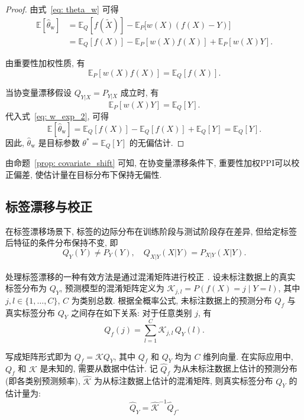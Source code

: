 \documentclass[a4paper, AutoFakeBold, UTF8]{ctexrep}
\theoremstyle{plain}
\newcommand{\upcite}[1]
{\textsuperscript{~\cite{#1}}}
\numberwithin{equation}{chapter}
\begin{document}
\begin{proof}
由式~\eqref{eq: theta_w} 可得
\begin{align}
\mathbb{E}[\hat{\theta}_{\text{w}}]
&=
\mathbb{E}_Q[f (\tilde X) ]
-
\mathbb{E}_P\bigl[w (X)  (f (X) -Y) \bigr] \label{eq: w_exp_1}\\
&=
\mathbb{E}_Q[f (X) ]
-
\mathbb{E}_P[w (X) f (X) ]
+
\mathbb{E}_P[w (X) Y].
\label{eq: w_exp_2}
\end{align}

由重要性加权性质, 有
\[
\mathbb{E}_P[w (X) f (X) ] = \mathbb{E}_Q[f (X) ].
\]

当协变量漂移假设 $Q_{Y|X}=P_{Y|X}$ 成立时, 有
\[
\mathbb{E}_P[w (X) Y]
=
\mathbb{E}_Q[Y].
\]
代入式~\eqref{eq: w_exp_2}, 可得
\begin{equation}
\mathbb{E}[\hat{\theta}_{\text{w}}]
=
\mathbb{E}_Q[f (X) ]
-
\mathbb{E}_Q[f (X) ]
+
\mathbb{E}_Q[Y]
=
\mathbb{E}_Q[Y].
\label{eq: w_exp_result}
\end{equation}
因此, $\hat{\theta}_{\text{w}}$ 是目标参数 $\theta^*=\mathbb{E}_Q[Y]$ 的无偏估计. 
\end{proof}

由命题~\ref{prop: covariate_shift} 可知, 在协变量漂移条件下, 重要性加权PPI可以校正偏差, 使估计量在目标分布下保持无偏性. 

\subsection{标签漂移与校正}

在标签漂移场景下, 标签的边际分布在训练阶段与测试阶段存在差异, 但给定标签后特征的条件分布保持不变, 即
\begin{equation}
Q_Y (Y)  \neq P_Y (Y), \quad Q_{X|Y} (X|Y)  = P_{X|Y} (X|Y). \label{eq: label_shift_def}
\end{equation}

处理标签漂移的一种有效方法是通过混淆矩阵进行校正\upcite{Lipton2018}. 设未标注数据上的真实标签分布为 $Q_Y$, 预测模型的混淆矩阵定义为 $\mathcal{K}_{j, l} = P (f (X) =j \mid Y=l) $, 其中 $j, l \in \{1, \ldots, C\}$, $C$ 为类别总数. 根据全概率公式, 未标注数据上的预测分布 $Q_f$ 与真实标签分布 $Q_Y$ 之间存在如下关系: 对于任意类别 $j$, 有
\begin{equation}
Q_f (j)  = \sum_{l=1}^{C} \mathcal{K}_{j, l} \, Q_Y (l). \label{eq: Q_f}
\end{equation}

写成矩阵形式即为 $Q_f = \mathcal{K} Q_Y$, 其中 $Q_f$ 和 $Q_Y$ 均为 $C$ 维列向量. 在实际应用中, $Q_f$ 和 $\mathcal{K}$ 是未知的, 需要从数据中估计. 记 $\hat{Q}_f$ 为从未标注数据上估计的预测分布 (即各类别预测频率), $\hat{\mathcal{K}}$ 为从标注数据上估计的混淆矩阵, 则真实标签分布 $Q_Y$ 的估计量为: 
\begin{equation}
\hat{Q}_Y = \hat{\mathcal{K}}^{-1} \hat{Q}_f. \label{eq: hat_Q_Y}
\end{equation}
\end{document}
